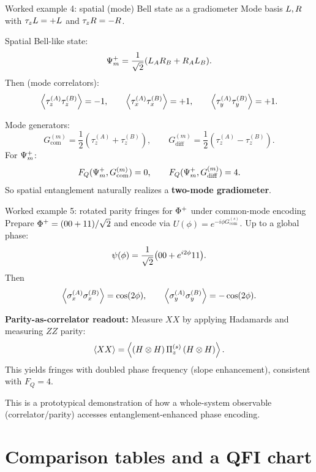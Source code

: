 \documentclass[aspectratio=169]{beamer}
\newcommand{\sA}[1]{\sigma_{#1}^{(A)}}
\newcommand{\sB}[1]{\sigma_{#1}^{(B)}}
\newcommand{\tA}[1]{\tau_{#1}^{(A)}}
\newcommand{\tB}[1]{\tau_{#1}^{(B)}}
\newcommand{\GcomS}{G_{\mathrm{com}}^{(s)}}
\newcommand{\GcomM}{G_{\mathrm{com}}^{(m)}}
\newcommand{\GdiffM}{G_{\mathrm{diff}}^{(m)}}
\newcommand{\PiZs}{\Pi_{z}^{(s)}}
\begin{document}
\begin{frame}{Worked example 4: spatial (mode) Bell state as a gradiometer}
\small
Mode basis $\relax{L},\relax{R}$ with $\tau_z\relax{L}=+\relax{L}$ and $\tau_z\relax{R}=-\relax{R}$.

Spatial Bell-like state:
\[
\relax{\Psi_m^+}=\frac{1}{\sqrt2}\qty(\relax{L_A R_B}+\relax{R_A L_B}).
\]
Then (mode correlators):
\[
\expval{\tA{z}\tB{z}}=-1,\qquad
\expval{\tA{x}\tB{x}}=+1,\qquad
\expval{\tA{y}\tB{y}}=+1.
\]

\vspace{0.35em}
Mode generators:
\[
\GcomM=\frac12(\tA{z}+\tB{z}),\qquad
\GdiffM=\frac12(\tA{z}-\tB{z}).
\]
For $\relax{\Psi_m^+}$:
\[
F_Q(\ket{\Psi_m^+},\GcomM)=0,\qquad
F_Q(\ket{\Psi_m^+},\GdiffM)=4.
\]
So spatial entanglement naturally realizes a \textbf{two-mode gradiometer}.
\end{frame}

\begin{frame}{Worked example 5: rotated parity fringes for $\relax{\Phi^+}$ under common-mode encoding}
\small
Prepare $\relax{\Phi^+}=(\relax{00}+\relax{11})/\sqrt2$ and encode via $U(\phi)=e^{-i\phi \GcomS}$.
Up to a global phase:
\[
\relax{\psi(\phi)}=\frac{1}{\sqrt2}\qty(\relax{00}+e^{i2\phi}\relax{11}).
\]
Then
\[
\expval{\sA{x}\sB{x}} = \cos(2\phi),\qquad
\expval{\sA{y}\sB{y}} = -\cos(2\phi).
\]

\vspace{0.35em}
\textbf{Parity-as-correlator readout:}
Measure $XX$ by applying Hadamards and measuring $ZZ$ parity:
\[
\expval{XX}=\expval{(H\otimes H)\,\PiZs\,(H\otimes H)}.
\]
This yields fringes with doubled phase frequency (slope enhancement), consistent with $F_Q=4$.

\vspace{0.25em}
This is a prototypical demonstration of how a whole-system observable (correlator/parity) accesses entanglement-enhanced phase encoding.
\end{frame}

\section{Comparison tables and a QFI chart}
\end{document}
